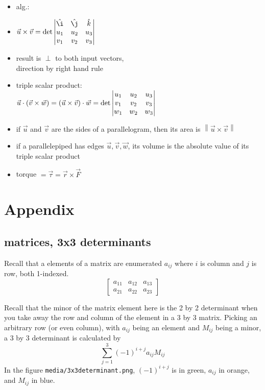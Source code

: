 \documentclass[11pt]{article}
\theoremstyle{definition}
\newcommand{\addsection}[1]{\section*{#1}\addcontentsline{toc}{section}{#1}} %
\newcommand{\magn}[1]{\left\lVert #1 \right\rVert}
\begin{document}
\begin{multicols}{2}
{\begin{itemize}
\begin{itemize}
        img\\
        $\magn{\vec{u}\times\vec{v}} = \magn{\vec{{u}}}\magn{\vec{v}}\sin\theta$
        \item alg.:
        \item $\vec{u} \times \vec{v} = \det\begin{vmatrix}
          \hat{\i} & \hat{\j} & \hat{k}\\
          u_1 & u_2 & u_3 \\
          v_1 & v_2 & v_3
        \end{vmatrix}$
        \item result is $\perp$ to both input vectors, \\
        direction by right hand rule
        \item triple scalar product: \\
        $\vec{u} \cdot (\vec{v}\times\vec{w}) \\ 
        = (\vec{u}\times\vec{v})\cdot\vec{w} \\
        = \det\begin{vmatrix}
          u_1 & u_2 & u_3 \\
          v_1 & v_2 & v_3 \\
          w_1 & w_2 & w_3
        \end{vmatrix}$
        \item if $\vec{u}$ and $\vec{v}$ are the sides of a parallelogram, then its area is $\magn{\vec{u}\times\vec{v}}$
        \item if a parallelepiped has edges $\vec{u}, \vec{v}, \vec{w}$, its volume is the absolute value of its triple scalar product
        \item torque $= \vec{\tau} = \vec{r} \times \vec{F}$
      \end{itemize}
    \end{itemize}
  }
\end{multicols}

\newpage
\addsection{Appendix} 
\subsection*{matrices, 3x3 determinants}
Recall that a elements of a matrix are enumerated $a_{ij}$ where $i$ is column and $j$ is row, both 1-indexed. 
\[\begin{bmatrix}
  a_{11} & a_{12} & a_{13}\\
  a_{21} & a_{22} & a_{23}
\end{bmatrix}\]

Recall that the minor of the matrix element here is the 2 by 2 determinant when you take away the row and column of the element in a 3 by 3 matrix.  Picking an arbitrary row (or even column), with $a_{ij}$ being an element and $M_{ij}$ being a minor, a 3 by 3 determinant is calculated by 
\[ \sum_{j=1}^{3} (-1)^{i+j} a_{ij} M_{ij} \]
In the figure \texttt{media/3x3determinant.png}, $(-1)^{i+j}$ is in green, $a_{ij}$ in orange, and $M_{ij}$ in blue.
\end{document}
